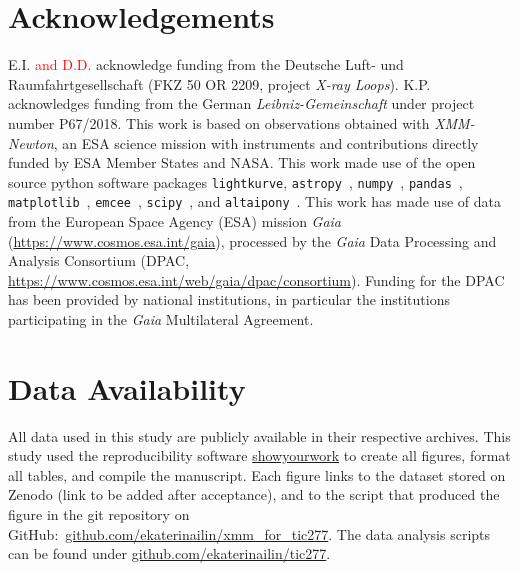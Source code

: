 \documentclass[twocolumn]{aastex631}
\begin{document}


\section*{Acknowledgements}
 E.I. \textcolor{red}{and D.D.} acknowledge funding from the Deutsche Luft- und Raumfahrtgesellschaft (FKZ 50 OR 2209, project \textit{X-ray Loops}). K.P. acknowledges funding from the German \textit{Leibniz-Gemeinschaft} under project number P67/2018. This work is based on observations obtained with \textit{XMM-Newton}, an ESA science mission with instruments and contributions directly funded by ESA Member States and NASA. This work made use of the open source python software packages \texttt{lightkurve}\citep{lightkurvecollaboration2018lightkurve}, \texttt{astropy}~\citep{robitaille2013astropy}, \texttt{numpy}~\citep{harris2020array}, \texttt{pandas}~\citep{reback2022pandasdev}, \texttt{matplotlib}~\citep{hunter2007matplotlib}, \texttt{emcee}~\citep{foreman-mackey2013emcee}, \texttt{scipy}~\citep{mckinney2010data}, and \texttt{altaipony}~\citep{ilin2021altaipony}. This work has made use of data from the European Space Agency (ESA) mission
{\it Gaia} (\url{https://www.cosmos.esa.int/gaia}), processed by the {\it Gaia}
Data Processing and Analysis Consortium (DPAC,
\url{https://www.cosmos.esa.int/web/gaia/dpac/consortium}). Funding for the DPAC
has been provided by national institutions, in particular the institutions
participating in the {\it Gaia} Multilateral Agreement.

\section*{Data Availability}
All data used in this study are publicly available in their respective archives.
This study used the reproducibility software \href{https://github.com/showyourwork/showyourwork}{showyourwork}
\citep{luger2021mappinga} to create all figures, format all tables, and compile the manuscript. Each figure links to the dataset stored on Zenodo (link to be added after acceptance), and to the script that produced the figure in the git repository on GitHub:~\href{https://github.com/ekaterinailin/xmm_for_tic277}{github.com/ekaterinailin/xmm\_for\_tic277}. The data analysis scripts can be found under \href{https://github.com/ekaterinailin/tic277}{github.com/ekaterinailin/tic277}. 


\end{document}
